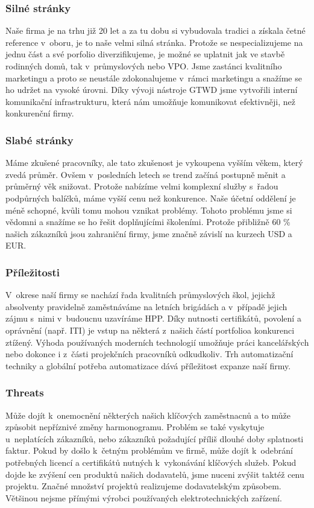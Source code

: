 \documentclass[a4paper, twoside, 11pt]{article}
\begin{document}
		\subsubsection{Silné stránky}
		Naše firma je na trhu již 20 let a za tu dobu si vybudovala tradici a získala četné reference v~oboru, je to naše velmi silná stránka. Protože se nespecializujeme na jednu část a své porfolio diverzifikujeme, je možné se uplatnit jak ve stavbě rodinných domů, tak v~průmyslových nebo VPO. Jsme zastánci kvalitního marketingu a proto se neustále zdokonalujeme v~rámci marketingu a snažíme se ho udržet na vysoké úrovni. Díky vývoji nástroje GTWD jsme vytvořili interní komunikační infrastrukturu, která nám umožňuje komunikovat efektivněji, než konkurenční firmy.	
		
		\subsubsection{Slabé stránky}
			Máme zkušené pracovníky, ale tato zkušenost je vykoupena vyšším věkem, který zvedá průměr. Ovšem v~posledních letech se trend začíná postupně měnit a průměrný věk snižovat. Protože nabízíme velmi komplexní služby s~řadou podpůrných balíčků, máme vyšší cenu než konkurence. Naše účetní oddělení je méně schopné, kvůli tomu mohou vznikat problémy. Tohoto problému jsme si vědomni a snažíme se ho řešit doplňujícími školeními. Protože přibližně 60 \% našich zákazníků jsou zahraniční firmy, jsme značně závislí na kurzech USD a EUR.
		
		
		\subsubsection{Příležitosti}
		V~okrese naší firmy se nachází řada kvalitních průmyslových škol, jejichž absolventy pravidelně zaměstnáváme na letních brigádách a v~případě jejich zájmu s~nimi v~budoucnu uzavíráme HPP. Díky nutnosti certifikátů, povolení a oprávnění (např. ITI) je vstup na některá z~našich částí portfolioa konkurenci ztížený. Výhoda používaných moderních technologií umožňuje práci kancelářských nebo dokonce i z~části projekčních pracovníků odkudkoliv. Trh automatizační techniky a globální potřeba automatizace dává příležitost expanze naší firmy.
		
		\subsubsection{Threats}
			Může dojít k~onemocnění některých našich klíčových zaměstnacnů a to může způsobit nepříznivé změny harmonogramu. Problém se také vyskytuje u~neplatících zákazníků, nebo zákazníků požadující příliš dlouhé doby splatnosti faktur. Pokud by došlo k~četným problémům ve firmě, může dojít k~odebrání potřebných licencí a certifikátů nutných k~vykonávání klíčových služeb. Pokud dojde ke zvýšení cen produktů našich dodavatelů, jsme nuceni zvýšit taktéž cenu projektu. Značné množství projektů realizujeme dodavatelským způsobem. Většinou nejsme přímými výrobci používaných elektrotechnických zařízení.
			
\end{document}
